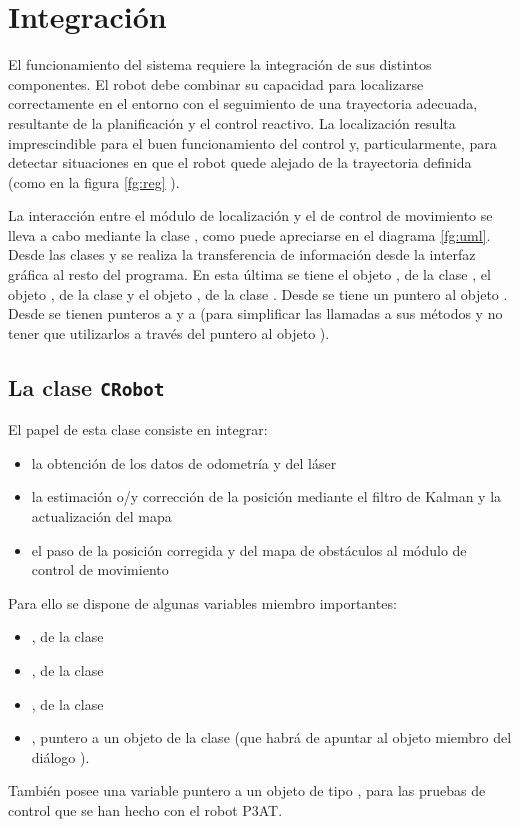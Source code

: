 
\chapter{Integración}\label{ch:integracion}

El funcionamiento del sistema requiere la integración de sus distintos componentes. El robot debe combinar su capacidad para localizarse correctamente en el entorno con el seguimiento de una trayectoria adecuada, resultante de la planificación y el control reactivo. La localización resulta imprescindible para el buen funcionamiento del control y, particularmente, para detectar situaciones en que el robot quede alejado de la trayectoria definida (como en la figura \ref{fg:reg}%
).

La interacción entre el módulo de localización y el de control de movimiento se lleva a cabo mediante la clase , como puede apreciarse en el diagrama \ref{fg:uml}.%
Desde las clases  y  se realiza la transferencia de información desde la interfaz gráfica al resto del programa. En esta última se tiene el objeto , de la clase , el objeto , de la clase  y el objeto , de la clase . Desde  se tiene un puntero al objeto . Desde  se tienen punteros a   y a  (para simplificar las llamadas a sus métodos y no tener que utilizarlos a través del puntero al objeto ).

\section{La clase \texttt{CRobot}}
El papel de esta clase consiste en integrar:
\begin{itemize}
  \item la obtención de los datos de odometría y del láser
  \item la estimación o/y corrección de la posición mediante el filtro de Kalman y la actualización del mapa
  \item el paso de la posición corregida y del mapa de obstáculos al módulo de control de movimiento
\end{itemize}
Para ello se dispone de algunas variables miembro importantes:
\begin{itemize}
  \item {}, de la clase 
  \item {}, de la clase 
  \item {}, de la clase 
  \item {}, puntero a un objeto de la clase  (que habrá de apuntar al objeto  miembro del diálogo ).
\end{itemize}
También posee una variable puntero a un objeto de tipo , para las pruebas de control que se han hecho con el robot P3AT.

